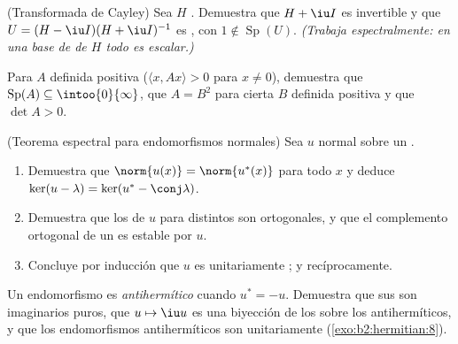 \begin{exercise}[$\star\star$]\label{exo:b2:hermitian:6}
(Transformada de Cayley) Sea $H$ . Demuestra que $H + \iu I$
es invertible y que $U = (H - \iu I)(H + \iu I)^{-1}$ es ,
con $1 \notin \operatorname{Sp}(U)$. \emph{(Trabaja espectralmente:
en una base de  de $H$ todo es escalar.)}
\end{exercise}

\begin{exercise}[$\star\star$]\label{exo:b2:hermitian:7}
Para $A$  definida positiva ($\langle x, Ax\rangle > 0$ para
$x \neq 0$), demuestra que $\operatorname{Sp}(A) \subseteq
\intoo{0}{\infty}$, que $A = B^2$ para cierta $B$  definida
positiva y que $\det A > 0$.
\end{exercise}

\begin{exercise}[$\star\star\star$]\label{exo:b2:hermitian:8}
(Teorema espectral para endomorfismos normales) Sea $u$ normal sobre
un .
\begin{enumerate}
  \item Demuestra que $\norm{u(x)} = \norm{u^*(x)}$ para todo $x$ y
        deduce $\ker(u - \lambda) = \ker(u^* - \conj\lambda)$.
  \item Demuestra que los  de $u$ para
         distintos son ortogonales, y que el
        complemento ortogonal de un  es estable por
        $u$.
  \item Concluye por inducción que $u$ es unitariamente
        ; y recíprocamente.
\end{enumerate}
\end{exercise}

\begin{exercise}[$\star$]\label{exo:b2:hermitian:9}
Un endomorfismo es \emph{antihermítico} cuando $u^* = -u$. Demuestra
que sus  son imaginarios puros, que $u \mapsto \iu u$
es una biyección de los  sobre los
antihermíticos, y que los endomorfismos antihermíticos son
unitariamente  (\cref{exo:b2:hermitian:8}).
\end{exercise}

